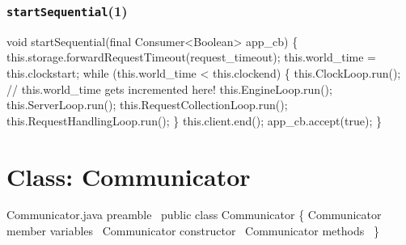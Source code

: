 \subsection{{\tt{}\protect{}startSequential}(1)}
\nwenddocs{}\endmoddef{}
void startSequential(final Consumer<Boolean> app_cb) \{
  this.storage.forwardRequestTimeout(request_timeout);
  this.world_time = this.clockstart;
  while (this.world_time < this.clockend) \{
    this.ClockLoop.run();  // this.world_time gets incremented here!
    this.EngineLoop.run();
    this.ServerLoop.run();
    this.RequestCollectionLoop.run();
    this.RequestHandlingLoop.run();
  \}
  this.client.end();
  app_cb.accept(true);
\}
\eatline
{}\nwendcode{}\nwdocspar
























\nwenddocs{}\chapter{Class: Communicator}
\label{communicator}

\nwenddocs{}\endmoddef{}
\LA{}Communicator.java preamble~{\nwtagstyle{}}\RA{}
public class Communicator \{
  \LA{}\code{}Communicator\edoc{} member variables~{\nwtagstyle{}}\RA{}
  \LA{}\code{}Communicator\edoc{} constructor~{\nwtagstyle{}}\RA{}
  \LA{}\code{}Communicator\edoc{} methods~{\nwtagstyle{}}\RA{}
\}
\nwendcode{}\nwdocspar


